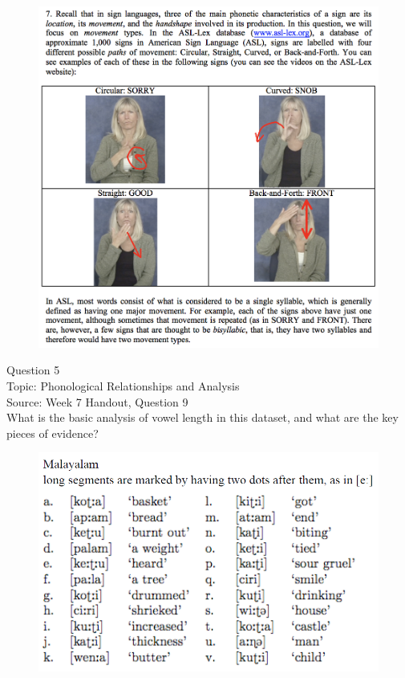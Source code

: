 \documentclass[12pt]{article}
\begin{document}
\begin{figure}[H]
\includegraphics{../images/ASL_movement.png}
\end{figure}

\newpage

{\large Question 5}\\

Topic: Phonological Relationships and Analysis\\
Source: Week 7 Handout, Question 9\\

What is the basic analysis of vowel length in this dataset, and what are the key pieces of evidence?\\

\begin{figure}[H]
\includegraphics{../images/malayalam.png}
\end{figure}
\end{document}
